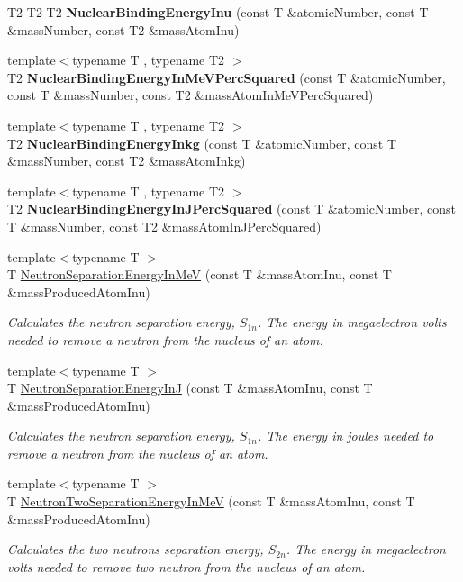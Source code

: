 \begin{DoxyCompactItemize}
T2 T2 T2 {\bfseries Nuclear\+Binding\+Energy\+Inu} (const T \&atomic\+Number, const T \&mass\+Number, const T2 \&mass\+Atom\+Inu)
\item 
{\footnotesize template$<$typename T , typename T2 $>$ }\\T2 {\bfseries Nuclear\+Binding\+Energy\+In\+Me\+V\+Perc\+Squared} (const T \&atomic\+Number, const T \&mass\+Number, const T2 \&mass\+Atom\+In\+Me\+V\+Perc\+Squared)
\item 
{\footnotesize template$<$typename T , typename T2 $>$ }\\T2 {\bfseries Nuclear\+Binding\+Energy\+Inkg} (const T \&atomic\+Number, const T \&mass\+Number, const T2 \&mass\+Atom\+Inkg)
\item 
{\footnotesize template$<$typename T , typename T2 $>$ }\\T2 {\bfseries Nuclear\+Binding\+Energy\+In\+J\+Perc\+Squared} (const T \&atomic\+Number, const T \&mass\+Number, const T2 \&mass\+Atom\+In\+J\+Perc\+Squared)
\item 
{\footnotesize template$<$typename T $>$ }\\T \hyperlink{group___nuclear_separation_energy_ga66133edb5809c81dd9fd60e09ebbef79}{Neutron\+Separation\+Energy\+In\+MeV} (const T \&mass\+Atom\+Inu, const T \&mass\+Produced\+Atom\+Inu)
\begin{DoxyCompactList}\small\item\em Calculates the neutron separation energy, $S_{1n}$. The energy in megaelectron volts needed to remove a neutron from the nucleus of an atom. \end{DoxyCompactList}\item 
{\footnotesize template$<$typename T $>$ }\\T \hyperlink{group___nuclear_separation_energy_ga14a4bb972ae000ef4ff35f2734ff22d0}{Neutron\+Separation\+Energy\+InJ} (const T \&mass\+Atom\+Inu, const T \&mass\+Produced\+Atom\+Inu)
\begin{DoxyCompactList}\small\item\em Calculates the neutron separation energy, $S_{1n}$. The energy in joules needed to remove a neutron from the nucleus of an atom. \end{DoxyCompactList}\item 
{\footnotesize template$<$typename T $>$ }\\T \hyperlink{group___nuclear_separation_energy_ga09985fc876eb632695bfbc1f2f325401}{Neutron\+Two\+Separation\+Energy\+In\+MeV} (const T \&mass\+Atom\+Inu, const T \&mass\+Produced\+Atom\+Inu)
\begin{DoxyCompactList}\small\item\em Calculates the two neutrons separation energy, $S_{2n}$. The energy in megaelectron volts needed to remove two neutron from the nucleus of an atom. \end{DoxyCompactList}\item 

\end{DoxyCompactItemize}
